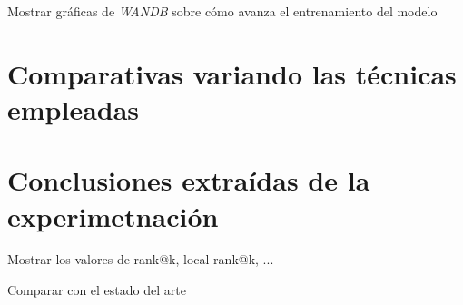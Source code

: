 Mostrar gráficas de \textit{WANDB} sobre cómo avanza el entrenamiento del modelo

\section{Comparativas variando las técnicas empleadas} \label{isec:experimentacion_variar_tecnicas}

\section{Conclusiones extraídas de la experimetnación} \label{isec:conclusiones_experimentacion}

Mostrar los valores de rank@k, local rank@k, ...

Comparar con el estado del arte
